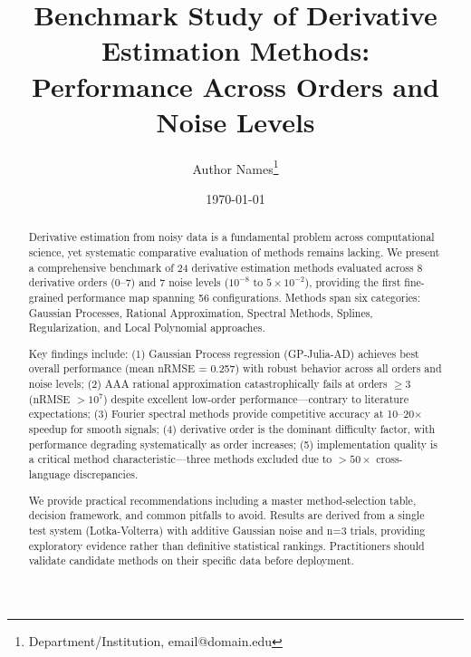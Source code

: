 \documentclass[11pt]{article}
\title{Benchmark Study of Derivative Estimation Methods:\\
Performance Across Orders and Noise Levels}
\author{
    Author Names\thanks{Department/Institution, email@domain.edu}
}
\date{\today}
\begin{document}
\maketitle

\begin{abstract}
Derivative estimation from noisy data is a fundamental problem across computational science, yet systematic comparative evaluation of methods remains lacking. We present a comprehensive benchmark of 24 derivative estimation methods evaluated across 8 derivative orders (0--7) and 7 noise levels ($10^{-8}$ to $5 \times 10^{-2}$), providing the first fine-grained performance map spanning 56 configurations. Methods span six categories: Gaussian Processes, Rational Approximation, Spectral Methods, Splines, Regularization, and Local Polynomial approaches.

Key findings include: (1) Gaussian Process regression (GP-Julia-AD) achieves best overall performance (mean nRMSE = 0.257) with robust behavior across all orders and noise levels; (2) AAA rational approximation catastrophically fails at orders $\geq 3$ (nRMSE $> 10^7$) despite excellent low-order performance—contrary to literature expectations; (3) Fourier spectral methods provide competitive accuracy at 10--20$\times$ speedup for smooth signals; (4) derivative order is the dominant difficulty factor, with performance degrading systematically as order increases; (5) implementation quality is a critical method characteristic—three methods excluded due to $>50\times$ cross-language discrepancies.

We provide practical recommendations including a master method-selection table, decision framework, and common pitfalls to avoid. Results are derived from a single test system (Lotka-Volterra) with additive Gaussian noise and n=3 trials, providing exploratory evidence rather than definitive statistical rankings. Practitioners should validate candidate methods on their specific data before deployment.
\end{abstract}

\tableofcontents
\newpage



\end{document}
